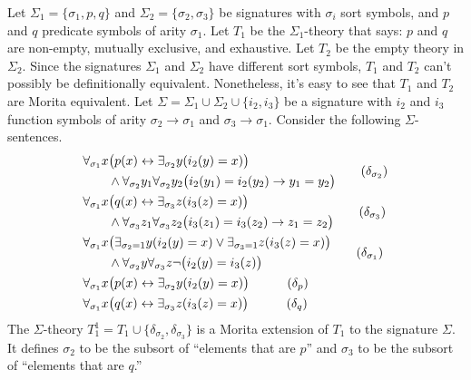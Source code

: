\begin{example}
  Let $\Sigma _1 =\{ \sigma _1,p,q\}$ and
  $\Sigma _2=\{ \sigma _2,\sigma _3 \}$ be signatures with $\sigma _i$
  sort symbols, and $p$ and $q$ predicate symbols of arity
  $\sigma _1$.  Let $T_1$ be the $\Sigma_1$-theory that says: $p$ and
  $q$ are non-empty, mutually exclusive, and exhaustive.  Let $T_2$ be
  the empty theory in $\Sigma _2$.  Since the signatures $\Sigma _1$
  and $\Sigma _2$ have different sort symbols, $T_1$ and $T_2$ can't
  possibly be definitionally equivalent.  Nonetheless, it's easy to
  see that $T_1$ and $T_2$ are Morita equivalent. Let
  $\Sigma=\Sigma_1\cup\Sigma_2\cup\{i_2, i_3\}$ be a signature with
  $i_2$ and $i_3$ function symbols of arity
  $\sigma_2\rightarrow\sigma_1$ and
  $\sigma_3\rightarrow\sigma_1$. Consider the following
  $\Sigma$-sentences.
\begin{align*}
%
&\begin{aligned}
&\forall_{\sigma_1}x\big(p(x)\leftrightarrow\exists_{\sigma_2} y(i_2(y)=x)\big)\\
&\qquad\land\forall_{\sigma_2} y_1\forall_{\sigma_2} y_2\big(i_2(y_1)=i_2(y_2)\rightarrow y_1=y_2\big)\\
\end{aligned}
\tag{$\delta_{\sigma_2}$}\\
%
&\begin{aligned}
&\forall_{\sigma_1}x\big(q(x)\leftrightarrow\exists_{\sigma_3} z(i_3(z)=x)\big)\\
&\qquad\land\forall_{\sigma_3} z_1\forall_{\sigma_3} z_2\big(i_3(z_1)=i_3(z_2)\rightarrow z_1=z_2\big)\\
\end{aligned}
\tag{$\delta_{\sigma_3}$}\\
&\begin{aligned}
&\forall_{\sigma_1} x\big(\exists_{\sigma_2=1}y(i_2(y)=x)\lor\exists_{\sigma_3=1} z(i_3(z)=x)\big)\\
&\qquad\land \forall_{\sigma_2} y\forall_{\sigma_3} z \lnot\big(i_2(y)=i_3(z)\big)\\
\end{aligned}
\tag{$\delta_{\sigma_1}$}\\
&\begin{aligned}
&\forall_{\sigma_1} x\big(p(x)\leftrightarrow\exists_{\sigma_2} y(i_2(y)=x)\big)
\end{aligned} 
\tag{$\delta_p$}\\
%
&\begin{aligned}
&\forall_{\sigma_1} x\big(q(x)\leftrightarrow\exists_{\sigma_3} z(i_3(z)=x)\big)
\end{aligned}
\tag{$\delta_q$}
\end{align*}
The $\Sigma$-theory
$T_1^1=T_1\cup\{\delta_{\sigma_2}, \delta_{\sigma_3}\}$ is a Morita
extension of $T_1$ to the signature $\Sigma$.  It defines $\sigma_2$
to be the subsort of ``elements that are $p$'' and $\sigma_3$ to be
the subsort of ``elements that are $q$.''


\end{example}
